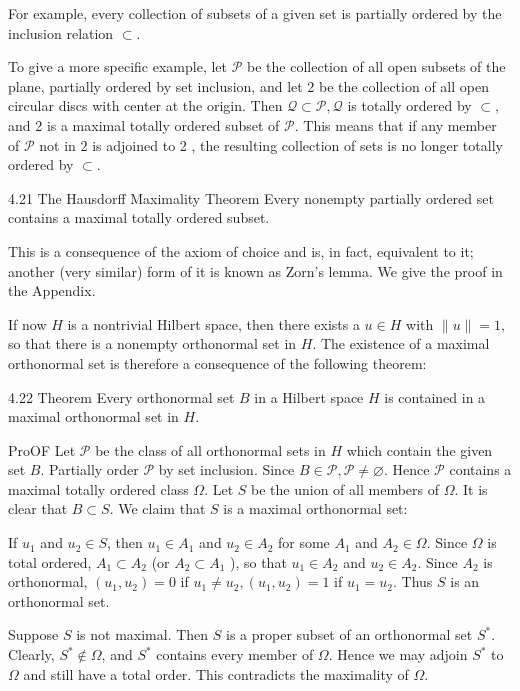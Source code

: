 \documentclass[10pt]{article}
\begin{document}
For example, every collection of subsets of a given set is partially ordered by the inclusion relation $\subset$.

To give a more specific example, let $\mathscr{P}$ be the collection of all open subsets of the plane, partially ordered by set inclusion, and let 2 be the collection of all open circular discs with center at the origin. Then $\mathscr{Q} \subset \mathscr{P}, \mathscr{Q}$ is totally ordered by $\subset$, and 2 is a maximal totally ordered subset of $\mathscr{P}$. This means that if any member of $\mathscr{P}$ not in $\mathscr{2}$ is adjoined to 2 , the resulting collection of sets is no longer totally ordered by $\subset$.

4.21 The Hausdorff Maximality Theorem Every nonempty partially ordered set contains a maximal totally ordered subset.

This is a consequence of the axiom of choice and is, in fact, equivalent to it; another (very similar) form of it is known as Zorn's lemma. We give the proof in the Appendix.

If now $H$ is a nontrivial Hilbert space, then there exists a $u \in H$ with $\|u\|=1$, so that there is a nonempty orthonormal set in $H$. The existence of a maximal orthonormal set is therefore a consequence of the following theorem:

4.22 Theorem Every orthonormal set $B$ in a Hilbert space $H$ is contained in a maximal orthonormal set in $H$.

ProOF Let $\mathscr{P}$ be the class of all orthonormal sets in $H$ which contain the given set $B$. Partially order $\mathscr{P}$ by set inclusion. Since $B \in \mathscr{P}, \mathscr{P} \neq \varnothing$. Hence $\mathscr{P}$ contains a maximal totally ordered class $\Omega$. Let $S$ be the union of all members of $\Omega$. It is clear that $B \subset S$. We claim that $S$ is a maximal orthonormal set:

If $u_{1}$ and $u_{2} \in S$, then $u_{1} \in A_{1}$ and $u_{2} \in A_{2}$ for some $A_{1}$ and $A_{2} \in \Omega$. Since $\Omega$ is total ordered, $A_{1} \subset A_{2}$ (or $A_{2} \subset A_{1}$ ), so that $u_{1} \in A_{2}$ and $u_{2} \in A_{2}$. Since $A_{2}$ is orthonormal, $\left(u_{1}, u_{2}\right)=0$ if $u_{1} \neq u_{2},\left(u_{1}, u_{2}\right)=1$ if $u_{1}=u_{2}$. Thus $S$ is an orthonormal set.

Suppose $S$ is not maximal. Then $S$ is a proper subset of an orthonormal set $S^{*}$. Clearly, $S^{*} \notin \Omega$, and $S^{*}$ contains every member of $\Omega$. Hence we may adjoin $S^{*}$ to $\Omega$ and still have a total order. This contradicts the maximality of $\Omega$.
\end{document}
